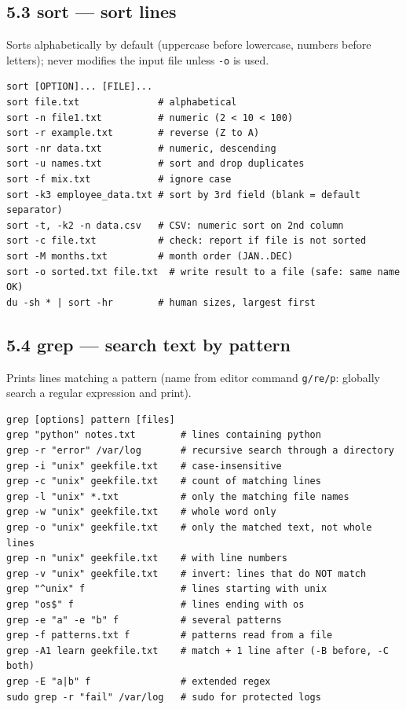 \documentclass[11pt,a4paper]{article}
\newcommand{\cmd}[1]{\texttt{#1}}
\begin{document}
\subsection{5.3 sort --- sort lines}
Sorts alphabetically by default (uppercase before lowercase, numbers before letters); never modifies the input file unless \cmd{-o} is used.
\begin{lstlisting}
sort [OPTION]... [FILE]...
sort file.txt              # alphabetical
sort -n file1.txt          # numeric (2 < 10 < 100)
sort -r example.txt        # reverse (Z to A)
sort -nr data.txt          # numeric, descending
sort -u names.txt          # sort and drop duplicates
sort -f mix.txt            # ignore case
sort -k3 employee_data.txt # sort by 3rd field (blank = default separator)
sort -t, -k2 -n data.csv   # CSV: numeric sort on 2nd column
sort -c file.txt           # check: report if file is not sorted
sort -M months.txt         # month order (JAN..DEC)
sort -o sorted.txt file.txt  # write result to a file (safe: same name OK)
du -sh * | sort -hr        # human sizes, largest first
\end{lstlisting}

\subsection{5.4 grep --- search text by pattern}
Prints lines matching a pattern (name from editor command \cmd{g/re/p}: globally search a regular expression and print).
\begin{lstlisting}
grep [options] pattern [files]
grep "python" notes.txt        # lines containing python
grep -r "error" /var/log       # recursive search through a directory
grep -i "unix" geekfile.txt    # case-insensitive
grep -c "unix" geekfile.txt    # count of matching lines
grep -l "unix" *.txt           # only the matching file names
grep -w "unix" geekfile.txt    # whole word only
grep -o "unix" geekfile.txt    # only the matched text, not whole lines
grep -n "unix" geekfile.txt    # with line numbers
grep -v "unix" geekfile.txt    # invert: lines that do NOT match
grep "^unix" f                 # lines starting with unix
grep "os$" f                   # lines ending with os
grep -e "a" -e "b" f           # several patterns
grep -f patterns.txt f         # patterns read from a file
grep -A1 learn geekfile.txt    # match + 1 line after (-B before, -C both)
grep -E "a|b" f                # extended regex
sudo grep -r "fail" /var/log   # sudo for protected logs
\end{lstlisting}
\end{document}
